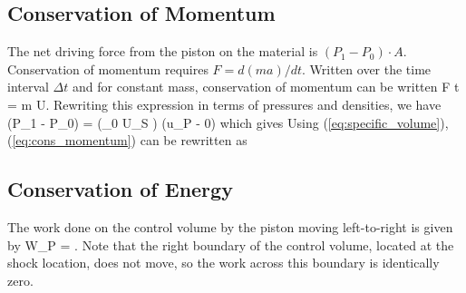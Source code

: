 \subsection{Conservation of Momentum}
The net driving force from the piston on the material is $(P_1 - P_0) \cdot A$.
Conservation of momentum requires $F = d(ma)/dt$.  Written over the time
interval $\Delta t$ and for constant mass, 
conservation of momentum can be written
\be
 F \cdot \Delta t = m \cdot \Delta U.
\ee
Rewriting this expression in terms of pressures and densities, we have
\be(P_1 - P_0) \cdot {} 
\cdot {} = \left(\rho_0 \cdot {} \cdot U_S \cdot 
{} \right) \; \left(u_P - 0\right) 
\ee
which gives
\be
{}
\label{eq:cons_momentum}
\ee
Using (\ref{eq:specific_volume}), (\ref{eq:cons_momentum}) can be
rewritten as
\be
{}
\label{eq:momentum_conservation_alt}
\ee

\subsection{Conservation of Energy}
The work done on the control volume by the piston moving left-to-right
is given by
\be
W_P = 
\cdot 
 .
\ee
Note that the right boundary of the control volume, located at the 
shock location, does not move, so the work across this boundary is 
identically zero.

